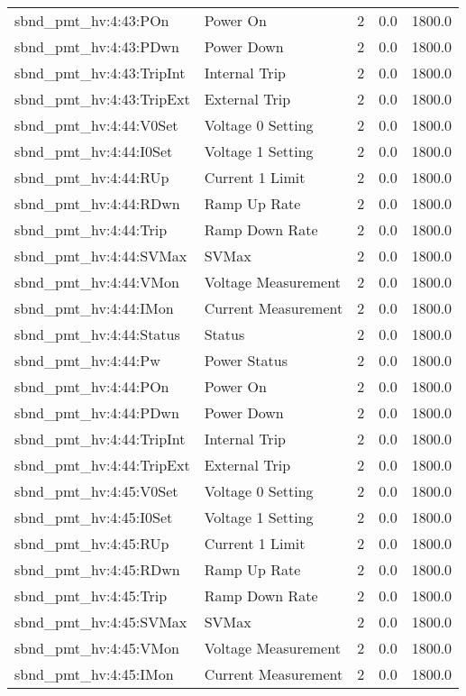 \begin{center}
\begin{longtable}{l | l l l l }
sbnd\_pmt\_hv:4:43:POn & Power On & 2 & 0.0 & 1800.0\\ 
sbnd\_pmt\_hv:4:43:PDwn & Power Down & 2 & 0.0 & 1800.0\\ 
sbnd\_pmt\_hv:4:43:TripInt & Internal Trip & 2 & 0.0 & 1800.0\\ 
sbnd\_pmt\_hv:4:43:TripExt & External Trip & 2 & 0.0 & 1800.0\\ 
sbnd\_pmt\_hv:4:44:V0Set & Voltage 0 Setting & 2 & 0.0 & 1800.0\\ 
sbnd\_pmt\_hv:4:44:I0Set & Voltage 1 Setting & 2 & 0.0 & 1800.0\\ 
sbnd\_pmt\_hv:4:44:RUp & Current 1 Limit & 2 & 0.0 & 1800.0\\ 
sbnd\_pmt\_hv:4:44:RDwn & Ramp Up Rate & 2 & 0.0 & 1800.0\\ 
sbnd\_pmt\_hv:4:44:Trip & Ramp Down Rate & 2 & 0.0 & 1800.0\\ 
sbnd\_pmt\_hv:4:44:SVMax & SVMax & 2 & 0.0 & 1800.0\\ 
sbnd\_pmt\_hv:4:44:VMon & Voltage Measurement & 2 & 0.0 & 1800.0\\ 
sbnd\_pmt\_hv:4:44:IMon & Current Measurement & 2 & 0.0 & 1800.0\\ 
sbnd\_pmt\_hv:4:44:Status & Status & 2 & 0.0 & 1800.0\\ 
sbnd\_pmt\_hv:4:44:Pw & Power Status & 2 & 0.0 & 1800.0\\ 
sbnd\_pmt\_hv:4:44:POn & Power On & 2 & 0.0 & 1800.0\\ 
sbnd\_pmt\_hv:4:44:PDwn & Power Down & 2 & 0.0 & 1800.0\\ 
sbnd\_pmt\_hv:4:44:TripInt & Internal Trip & 2 & 0.0 & 1800.0\\ 
sbnd\_pmt\_hv:4:44:TripExt & External Trip & 2 & 0.0 & 1800.0\\ 
sbnd\_pmt\_hv:4:45:V0Set & Voltage 0 Setting & 2 & 0.0 & 1800.0\\ 
sbnd\_pmt\_hv:4:45:I0Set & Voltage 1 Setting & 2 & 0.0 & 1800.0\\ 
sbnd\_pmt\_hv:4:45:RUp & Current 1 Limit & 2 & 0.0 & 1800.0\\ 
sbnd\_pmt\_hv:4:45:RDwn & Ramp Up Rate & 2 & 0.0 & 1800.0\\ 
sbnd\_pmt\_hv:4:45:Trip & Ramp Down Rate & 2 & 0.0 & 1800.0\\ 
sbnd\_pmt\_hv:4:45:SVMax & SVMax & 2 & 0.0 & 1800.0\\ 
sbnd\_pmt\_hv:4:45:VMon & Voltage Measurement & 2 & 0.0 & 1800.0\\ 
sbnd\_pmt\_hv:4:45:IMon & Current Measurement & 2 & 0.0 & 1800.0\\ 

\end{longtable}
\end{center}
